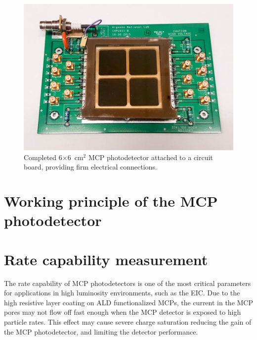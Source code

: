 \documentclass[preprint,5p]{elsarticle}
\begin{document}
\begin{figure}[tbp]
\centering 
\includegraphics[scale=0.23]{fig/MCPs_assembly.png}
\caption{Completed 6$\times$6~cm$^2$ MCP photodetector attached to a circuit 
board, providing firm electrical connections.} \label{fig:MCP_assm}
\end{figure}

\section{Working principle of the MCP photodetector}


\section{Rate capability measurement} \label{sec_proton_measurements}
The rate capability of MCP photodetectors is one of the most critical 
parameters for applications in high luminosity environments, such as the EIC.  
Due to the high resistive layer coating on ALD functionalized MCPs, the current 
in the MCP pores may not flow off fast enough when the MCP detector is exposed 
to high particle rates. This effect may cause severe charge saturation reducing 
the gain of the MCP photodetector, and limiting the detector performance. 
 
\end{document}
